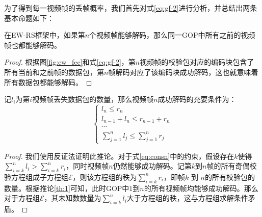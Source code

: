     为了得到每一视频帧的丢帧概率，我们首先对式\ref{eq:gf-2}进行分析，并总结出两条基本命题如下：

    \begin{corollary}\label{th:1}
    在EW-RS框架中，如果第$n$个视频帧能够解码，那么同一GOP中所有之前的视频帧也都能够解码。
    \end{corollary}

    \begin{proof}
    根据图\ref{fig:ew_fec}和式\ref{eq:gf-2}，第$n$视频帧的校验包对应的编码块包含了所有当前和之前帧的数据包，第$n$帧解码对应了该编码块成功解码，这也就意味着所有数据包都能够解码。
    \end{proof}

    \begin{corollary}\label{th:2}
    记$l_i$为第$i$视频帧丢失数据包的数量，那么视频帧$n$成功解码的充要条件为：
     \begin{equation}\label{eq:consn}
      \left\{ \begin{array}{ll}
        l_n \le r_n\\
        l_{n-1} + l_n \le r_{n-1} + r_n\\
        \cdots\\
        \sum_{j=1}^{n}l_j \le \sum_{j=1}^{n}r_j
      \end{array} \right.
    \end{equation}
    \end{corollary}

    \begin{proof}
    我们使用反证法证明此推论。对于式\ref{eq:consn}中的约束，假设存在$k$使得$\sum_{i=k}^{n}l_i > \sum_{i=k}^{n}r_i$，同时视频帧$n$仍然能够成功解码。记第$k$到$n$帧的所有奇偶校验方程组成子方程组$\mathcal{E}$，则该方程组的秩为$\sum_{i=k}^{n}r_i$，即帧$k$ 到 $n$的所有校验包的数量。根据推论\ref{th:1}可知，此时GOP中$1$到$n$的所有视频帧均能够成功解码。那么对于方程组$\mathcal{E}$，其未知数数量为$\sum_{i=k}^{n}l_i$大于方程组的秩，这与方程组求解条件矛盾。
    \end{proof}

